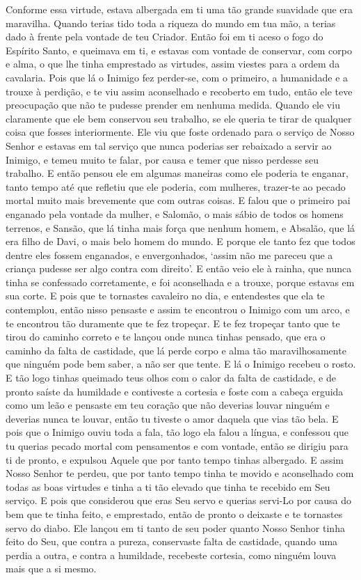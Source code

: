 Conforme essa virtude, estava albergada em ti uma tão grande suavidade que
era maravilha. Quando terias tido toda a riqueza do mundo em tua mão, a terias
dado à frente pela vontade de teu Criador. Então foi em ti aceso o fogo do
Espírito Santo, e queimava em ti, e estavas com vontade de conservar, com corpo
e alma, o que lhe tinha emprestado as virtudes, assim viestes para a ordem da
cavalaria. Pois que lá o Inimigo fez perder-se, com o primeiro, a humanidade e
a trouxe à perdição, e te viu assim aconselhado e recoberto em tudo, então ele
teve preocupação que não te pudesse prender em nenhuma medida. Quando ele viu
claramente que ele bem conservou seu trabalho, se ele queria te tirar de
qualquer coisa que fosses interiormente. Ele viu que foste ordenado para o
serviço de Nosso Senhor e estavas em tal serviço que nunca poderias ser
rebaixado a servir ao Inimigo, e temeu muito te falar, por causa e temer que
nisso perdesse seu trabalho. E então pensou ele em algumas maneiras como ele
poderia te enganar, tanto tempo até que refletiu que ele poderia, com mulheres,
trazer-te ao pecado mortal muito mais brevemente que com outras coisas. E falou
que o primeiro pai enganado pela vontade da mulher, e Salomão, o mais sábio de
todos os homens terrenos, e Sansão, que lá tinha mais força que nenhum homem, e
Absalão, que lá era filho de Davi, o mais belo homem do mundo. E porque ele
tanto fez que todos dentre eles fossem enganados, e envergonhados, ‘assim não
me pareceu que a criança pudesse ser algo contra com direito’. E então veio ele
à rainha, que nunca tinha se confessado corretamente, e foi aconselhada e a
trouxe, porque estavas em sua corte. E pois que te tornastes
cavaleiro no dia, e entendestes que ela te contemplou, então nisso pensaste e
assim te encontrou o Inimigo com um arco, e te encontrou tão duramente que te
fez tropeçar. E te fez tropeçar tanto que te tirou do caminho correto e te
lançou onde nunca tinhas pensado, que era o caminho da falta de castidade, que
lá perde corpo e alma tão maravilhosamente que ninguém pode bem saber, a não
ser que tente. E lá o Inimigo recebeu o rosto. E tão logo tinhas queimado teus
olhos com o calor da falta de castidade, e de pronto saíste da humildade e
contiveste a cortesia e foste com a cabeça erguida como um leão e pensaste em
teu coração que não deverias louvar ninguém e deverias nunca te louvar, então
tu tiveste o amor daquela que vias tão bela. E pois que o
Inimigo ouviu toda a fala, tão logo ela falou a língua, e confessou que tu
querias pecado mortal com pensamentos e com vontade, então se dirigiu para ti
de pronto, e expulsou Aquele que por tanto tempo tinhas albergado. E assim
Nosso Senhor te perdeu, que por tanto tempo tinha te movido e aconselhado com
todas as boas virtudes e tinha a ti tão elevado que tinha te recebido em Seu
serviço. E pois que considerou que eras Seu servo e querias servi-Lo por causa
do bem que te tinha feito, e emprestado, então de pronto o deixaste e te
tornastes servo do diabo. Ele lançou em ti tanto de seu poder quanto Nosso
Senhor tinha feito do Seu, que contra a pureza, conservaste falta de castidade,
quando uma perdia a outra, e contra a humildade, recebeste cortesia, como
ninguém louva mais que a si mesmo.

